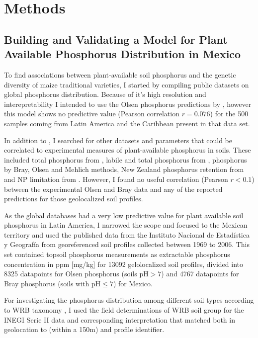 \section{Methods}
\subsection*{Building and Validating a Model for Plant Available Phosphorus Distribution in Mexico}

To find associations between plant-available soil phosphorus and the genetic diversity of maize traditional varieties, I started by compiling public datasets on global phosphorus distribution. Because of it's high resolution and interepretability I intended to use the Olsen \citep{olsen1954} phosphorus predictions by \citep{mcdowell2023}, however this model shows no predictive value (Pearson correlation $r=0.076$) for the 500 samples coming from Latin America and the Caribbean present in that data set.

In addition to \citep{mcdowell2023}, I searched for other datasets and parameters that could be correlated to experimental measures of plant-available phosphorus in soils.
These included total phosphorus from \citep{hexianjin2022}, labile and total phosphorus from \citep{yang2013}, phosphorus by Bray, Olsen and Mehlich \citep{mehlich1984} methods, New Zealand phosphorus retention from \citep{shangguan2014} and NP limitation from \citep{du2020}.
However, I found no useful correlation (Pearson $r < 0.1$) between the \citep{mcdowell2023} experimental Olsen and Bray data and any of the reported predictions for those geolocalized soil profiles.

As the global databases had a very low predictive value for plant available soil phosphorus in Latin America, I narrowed the scope and focused to the Mexican territory and used the published data from the Instituto Nacional de Estadística y Geografía \citep{paz-pellat2018} from georeferenced soil profiles collected between 1969 to 2006.
This set contained topsoil phosphorus measurements as extractable phosphorus concentration in ppm [mg/kg] for 13092 gelolocalized soil profiles, divided into 8325 datapoints for  Olsen phosphorus (soils $\text{pH} > 7$) and 4767 datapoints for Bray phosphorus  (soils with $\text{pH} \leq 7$) for Mexico. 

For investigating the phosphorus distribution among different soil types according to WRB taxonomy \citep{wrb2014},  I used the field determinations of WRB soil group for the INEGI Serie II data \citep{inegi2013} and corresponding interpretation \citep{inegi2011,inegi2009} that matched both in  geolocation to (within a 150m) and profile identifier. 

